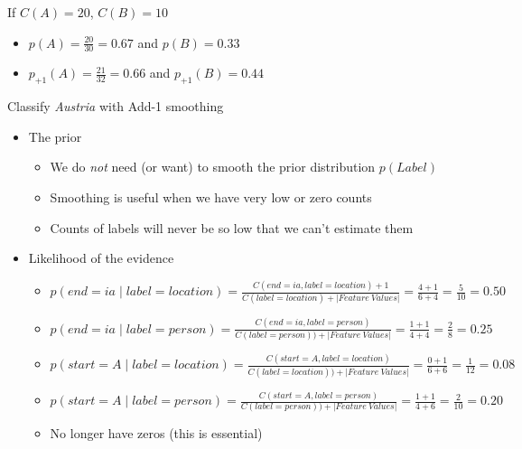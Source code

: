 \documentclass[11pt,letterpaper]{article}
\begin{document}
\begin{itemize}
\begin{itemize}
        If $C(A)=20$, $C(B)=10$
        \begin{itemize}
          \item $p(A)=\frac{20}{30} = \mathbf{0.67}$ and 
                $p(B) = \mathbf{0.33}$
          \item $p_{+1}(A)=\frac{21}{32} = \mathbf{0.66}$ and 
                $p_{+1}(B) = \mathbf{0.44}$
        \end{itemize}
    \end{itemize}
\end{itemize}


Classify \textit{Austria} with Add-1 smoothing

\begin{itemize}
  \item The prior
    \begin{itemize}
      \item We do \textit{not} need (or want) to smooth the prior distribution $p(Label)$
      \item Smoothing is useful when we have very low or zero counts
      \item Counts of labels will never be so low that we can't estimate them
    \end{itemize}

  \item Likelihood of the evidence
    \begin{itemize}
      \item $p(end=ia \mid label=location) = \frac{C(end=ia, label=location)+1}{C(label=location)+|Feature~Values|} = \frac{4+1}{6+4} = \frac{5}{10} = 0.50$
      \item $p(end=ia \mid label=person) = \frac{C(end=ia, label=person)}{C(label=person))+|Feature~Values|} = \frac{1+1}{4+4} = \frac{2}{8} = 0.25$
      \\
      \item $p(start=A \mid label=location) = \frac{C(start=A, label=location)}{C(label=location))+|Feature~Values|} = \frac{0+1}{6+6} = \frac{1}{12} = 0.08$
      \item $p(start=A \mid label=person) = \frac{C(start=A, label=person)}{C(label=person))+|Feature~Values|} = \frac{1+1}{4+6} = \frac{2}{10} = 0.20$
      \\
      \item No longer have zeros (this is essential)
    \end{itemize}



\end{itemize}
\end{document}
